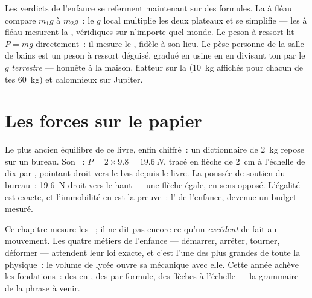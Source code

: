 \begin{remark}\label{rem:g9:weight-vs-mass:scales}
Les verdicts de l'enfance se referment maintenant sur des formules. La
 à fléau compare $m_1 g$ à $m_2 g$~: le $g$ local multiplie les
deux plateaux et se simplifie --- les  à fléau mesurent la
\emph{}, véridiques sur n'importe quel monde. Le peson à ressort
lit $P = m g$ directement~: il mesure le \emph{}, fidèle à son
lieu. Le pèse-personne de la salle de bains est un peson à ressort
déguisé, gradué en usine en  en divisant ton  par le
$g$ \emph{terrestre} --- honnête à la maison, flatteur sur la 
(\qty{10}{kg} affichés pour chacun de tes \qty{60}{kg}) et calomnieux
sur Jupiter.
\end{remark}

\section{Les forces sur le papier}

\begin{example}\label{ex:g9:weight-vs-mass:book}
Le plus ancien équilibre de ce livre, enfin chiffré~: un dictionnaire
de \qty{2}{kg} repose sur un bureau. Son ~:
$P = 2 \times 9.8 = \qty{19.6}{N}$, tracé en flèche de \qty{2}{cm} à
l'échelle de dix  par , pointant droit vers le bas
depuis le livre. La poussée de soutien du bureau~: \qty{19.6}{N} droit
vers le haut --- une flèche égale, en sens opposé. L'égalité est
exacte, et l'immobilité en est la preuve~: l' de l'enfance,
devenue un budget mesuré.
\end{example}

\begin{remark}\label{rem:g9:weight-vs-mass:dynamics}
Ce chapitre mesure les ~; il ne dit pas encore ce qu'un
\emph{excédent} de  fait au mouvement. Les quatre métiers de
l'enfance --- démarrer, arrêter, tourner, déformer --- attendent leur
loi exacte, et c'est l'une des plus grandes de toute la physique~: le
volume de lycée ouvre sa mécanique avec elle. Cette année achève les
fondations~: des  en , des  par formule, des flèches
à l'échelle --- la grammaire de la phrase à venir.
\end{remark}

